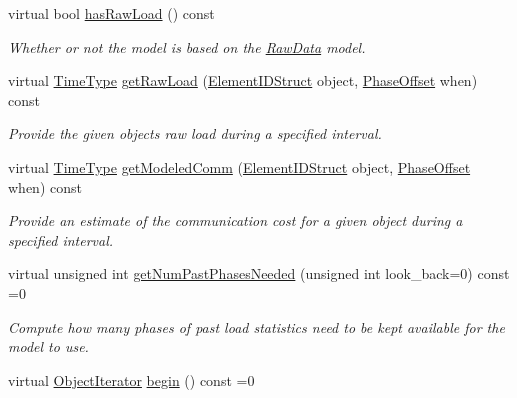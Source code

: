 \begin{DoxyCompactItemize}
virtual bool \hyperlink{structvt_1_1vrt_1_1collection_1_1balance_1_1_load_model_a626f65c651ea15f4a40b9f058778c620}{has\+Raw\+Load} () const
\begin{DoxyCompactList}\small\item\em Whether or not the model is based on the \hyperlink{structvt_1_1vrt_1_1collection_1_1balance_1_1_raw_data}{Raw\+Data} model. \end{DoxyCompactList}\item 
virtual \hyperlink{namespacevt_a876a9d0cd5a952859c72de8a46881442}{Time\+Type} \hyperlink{structvt_1_1vrt_1_1collection_1_1balance_1_1_load_model_ad8a47fa5f0ca872055e7216061e84884}{get\+Raw\+Load} (\hyperlink{namespacevt_1_1vrt_1_1collection_1_1balance_a9f5b53fafb270212279a4757d2c4cd28}{Element\+I\+D\+Struct} object, \hyperlink{structvt_1_1vrt_1_1collection_1_1balance_1_1_phase_offset}{Phase\+Offset} when) const
\begin{DoxyCompactList}\small\item\em Provide the given object\textquotesingle{}s raw load during a specified interval. \end{DoxyCompactList}\item 
virtual \hyperlink{namespacevt_a876a9d0cd5a952859c72de8a46881442}{Time\+Type} \hyperlink{structvt_1_1vrt_1_1collection_1_1balance_1_1_load_model_a1143c5dda0d3e409db174d5de6bfceb5}{get\+Modeled\+Comm} (\hyperlink{namespacevt_1_1vrt_1_1collection_1_1balance_a9f5b53fafb270212279a4757d2c4cd28}{Element\+I\+D\+Struct} object, \hyperlink{structvt_1_1vrt_1_1collection_1_1balance_1_1_phase_offset}{Phase\+Offset} when) const
\begin{DoxyCompactList}\small\item\em Provide an estimate of the communication cost for a given object during a specified interval. \end{DoxyCompactList}\item 
virtual unsigned int \hyperlink{structvt_1_1vrt_1_1collection_1_1balance_1_1_load_model_a44905eb3e15e7f22b2f8d1fe7297cea0}{get\+Num\+Past\+Phases\+Needed} (unsigned int look\+\_\+back=0) const =0
\begin{DoxyCompactList}\small\item\em Compute how many phases of past load statistics need to be kept available for the model to use. \end{DoxyCompactList}\item 
virtual \hyperlink{structvt_1_1vrt_1_1collection_1_1balance_1_1_object_iterator}{Object\+Iterator} \hyperlink{structvt_1_1vrt_1_1collection_1_1balance_1_1_load_model_a085a13e3cfeff2beb88b49ddaed4ef8d}{begin} () const =0

\end{DoxyCompactItemize}
